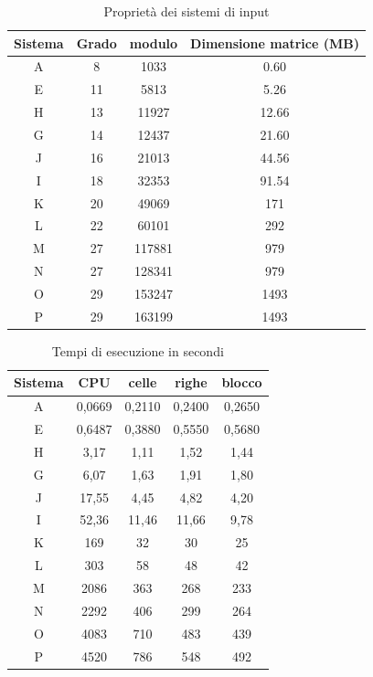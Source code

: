 \documentclass{article}
\begin{document}
\begin{table}[h!]
\centering
 \begin{tabular}{|c | c | c | c |} 
 \hline
 Sistema & Grado & modulo & Dimensione matrice (MB)\\
 \hline
A & 8  & 1033   & 0.60\\
E & 11 & 5813   & 5.26\\	
H & 13 & 11927  & 12.66\\
G & 14 & 12437  & 21.60 \\
J & 16 & 21013  & 44.56\\
I & 18 & 32353  & 91.54\\
K & 20 & 49069  & 171\\
L & 22 & 60101  & 292\\
M & 27 & 117881 & 979\\
N & 27 & 128341 & 979\\
O & 29 & 153247 & 1493\\
P & 29 & 163199 & 1493\\
 \hline

\end{tabular}
\caption{Proprietà dei sistemi di input}
\label{table:2}
\end{table}

\begin{table}[h!]
\centering
 \begin{tabular}{|c | c | c | c | c|} 
 \hline
 Sistema & CPU & celle & righe & blocco\\
 \hline
A & 0,0669    & 0,2110   & 0,2400   & 0,2650\\
E & 0,6487    & 0,3880   & 0,5550   & 0,5680\\	
H & 3,17      & 1,11     & 1,52     & 1,44\\
G & 6,07      & 1,63     & 1,91     & 1,80\\
J & 17,55     & 4,45     & 4,82     & 4,20\\
I & 52,36     & 11,46    & 11,66    & 9,78\\
K & 169       & 32       & 30       & 25\\
L & 303       & 58       & 48       & 42\\
M & 2086      & 363      & 268      & 233\\
N & 2292      & 406      & 299      & 264\\
O & 4083      & 710      & 483      & 439\\
P & 4520      & 786      & 548      & 492\\
 \hline

\end{tabular}
\caption{Tempi di esecuzione in secondi}
\label{table:1}
\end{table}
\end{document}

